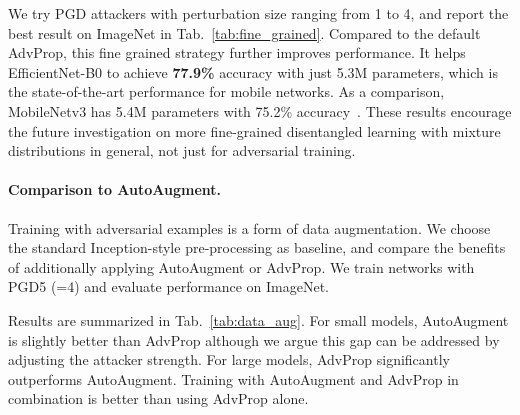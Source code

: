 \documentclass[10pt,twocolumn,letterpaper]{article}
\begin{document}
We try PGD attackers with perturbation size ranging from 1 to 4, and report the best result on ImageNet in Tab.~\ref{tab:fine_grained}. Compared to the default AdvProp, this fine grained strategy further improves performance.  It helps EfficientNet-B0 to achieve
\textbf{77.9\%} accuracy with just 5.3M parameters, which is the state-of-the-art performance
for mobile networks. As a comparison, MobileNetv3 has 5.4M parameters with 75.2\% accuracy~\cite{howard2019searching}.
These results encourage the future investigation on more fine-grained disentangled learning with mixture distributions in general, not just for adversarial training. 


\begin{table}[h!]\centering
{}
\vskip 0.05in
\caption{Fine-grained AdvProp substantially boosts model accuracy on ImageNet, especially for small models. We perform fine-grained disentangled learning by  keeping an additional auxiliary BN for AutoAugment images.}
\label{tab:fine_grained}
\vspace{-0.8em}
\end{table}



\paragraph{Comparison to AutoAugment.}
Training with adversarial examples is a form of data augmentation. We choose the standard Inception-style pre-processing \cite{Szegedy2015} as baseline, and compare the benefits of additionally applying AutoAugment or AdvProp.
We train networks with PGD5 (=4) and evaluate performance on ImageNet.


Results are summarized in Tab.~\ref{tab:data_aug}. For small models, AutoAugment is slightly better than AdvProp although we argue this gap can be addressed by adjusting the attacker strength. For large models, AdvProp significantly outperforms AutoAugment. Training with AutoAugment and AdvProp in combination is better than using AdvProp alone.
\end{document}
